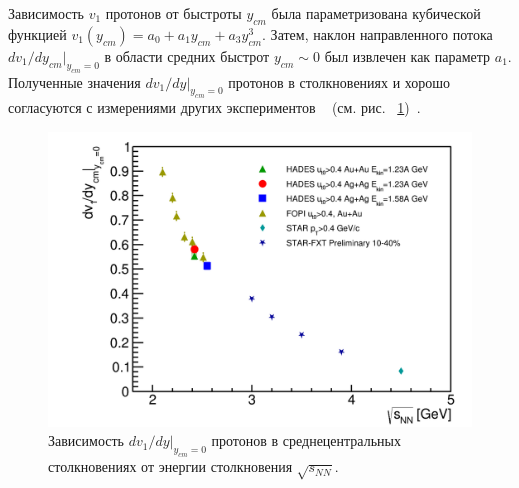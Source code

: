 Зависимость  $v_1$ протонов от  быстроты $y_{cm}$ была параметризована кубической функцией $v_1(y_{cm}) = a_0 + a_1 y_{cm} + a_3 y_{cm}^3$. 
Затем, наклон направленного потока  $dv_1/dy_{cm}|_{y_{cm}=0}$ в области средних быстрот $y_{cm}\sim0$ был извлечен как параметр $a_1$.
Полученные значения $dv_1/dy|_{y_{cm}=0}$ протонов в столкновениях \au{}  и \ag{} хорошо согласуются с измерениями  других экспериментов ~\cite{FOPI:2011aa,STAR:2020dav} (см. рис. ~\ref{fig:hades_dv1_dy_sqrt_snn})~\cite{Mamaev:2024-1,Mamaev:2024-2}.
%
\begin{figure}[h]
\begin{center}
\includegraphics[width=0.47\linewidth]{images/dv1_dy_sqrt_snn.png}
\caption{ 
  Зависимость $dv_1/dy|_{y_{cm}=0}$ протонов в среднецентральных столкновениях от  энергии столкновения $\sqrt{s_{NN}}$.
}
\label{fig:hades_dv1_dy_sqrt_snn}
\end{center}
\end{figure}


